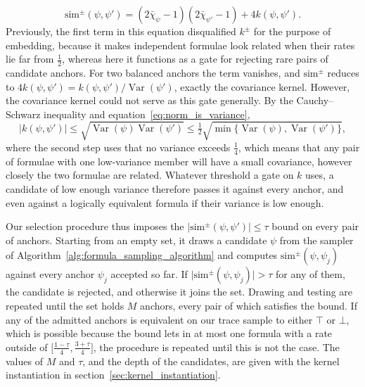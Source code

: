 \documentclass[titlepage,a4paper,11pt]{report}
\begin{document}
    \begin{equation}\label{eq:sim_pm_decomposition}
        \mathrm{sim}^\pm(\psi,\psi')=(2\bar\chi_\psi-1)(2\bar\chi_{\psi'}-1)+4k(\psi,\psi').
    \end{equation}
    Previously, the first term in this equation disqualified $k^\pm$ for the purpose of embedding, because it makes independent formulae look related when their rates lie far from $\tfrac12$, whereas here it functions as a gate for rejecting rare pairs of candidate anchors. For two balanced anchors the term vanishes, and $\mathrm{sim}^\pm$ reduces to $4k(\psi,\psi')=k(\psi,\psi')/\operatorname{Var}(\psi')$, exactly the covariance kernel. However, the covariance kernel could not serve as this gate generally. By the Cauchy--Schwarz inequality and equation~\eqref{eq:norm_is_variance},
    \begin{equation}\label{eq:covariance_gate}
        \lvert k(\psi,\psi')\rvert\le\sqrt{\operatorname{Var}(\psi)\operatorname{Var}(\psi')}\le\tfrac12\sqrt{\min\{\operatorname{Var}(\psi),\operatorname{Var}(\psi')\}},
    \end{equation}
    where the second step uses that no variance exceeds $\tfrac14$, which means that any pair of formulae with one low-variance member will have a small covariance, however closely the two formulae are related. Whatever threshold a gate on $k$ uses, a candidate of low enough variance therefore passes it against every anchor, and even against a logically equivalent formula if their variance is low enough.

    Our selection procedure thus imposes the $\lvert\mathrm{sim}^\pm(\psi,\psi')\rvert\le\tau$ bound on every pair of anchors. Starting from an empty set, it draws a candidate $\psi$ from the sampler of Algorithm~\ref{alg:formula_sampling_algorithm} and computes $\mathrm{sim}^\pm(\psi,\psi_j)$ against every anchor $\psi_j$ accepted so far. If $\lvert\mathrm{sim}^\pm(\psi,\psi_j)\rvert>\tau$ for any of them, the candidate is rejected, and otherwise it joins the set. Drawing and testing are repeated until the set holds $M$ anchors, every pair of which satisfies the bound. If any of the admitted anchors is equivalent on our trace sample to either $\top$ or $\bot$, which is possible because the bound lets in at most one formula with a rate outside of $\bigl[\frac{1-\tau}{4},\frac{3+\tau}{4}\bigr]$, the procedure is repeated until this is not the case. The values of $M$ and $\tau$, and the depth of the candidates, are given with the kernel instantiation in section~\ref{sec:kernel_instantiation}. 
    
\end{document}
